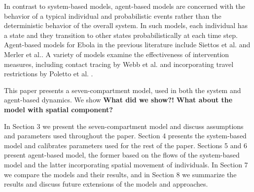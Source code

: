 In contrast to system-based models, agent-based models are concerned with the behavior of a typical individual and probabilistic events rather than the deterministic behavior of the overall system. In such models, each individual has a state and they transition to other states probabilistically at each time step. Agent-based models for Ebola in the previous literature include Siettos et al. \cite{Siettos2015} and Merler et al.\cite{Merler2015}. A variety of models examine the effectiveness of intervention measures, including contact tracing by Webb et al. \cite{Webb2015} and incorporating travel restrictions by Poletto et al. \cite{Poletto2014}.

This paper presents a seven-compartment model, used in both the system and agent-based dynamics. We show \textbf{What did we show?!} \textbf{What about the model with spatial component?}

In Section 3 we present the seven-compartment model and discuss assumptions and parameters used throughout the paper. Section 4 presents the system-based model and calibrates parameters used for the rest of the paper. Sections 5 and 6 present agent-based model, the former based on the flows of the system-based model and the latter incorporating spatial movement of individuals. In Section 7 we compare the models and their results, and in Section 8 we summarize the results and discuss future extensions of the models and approaches. 